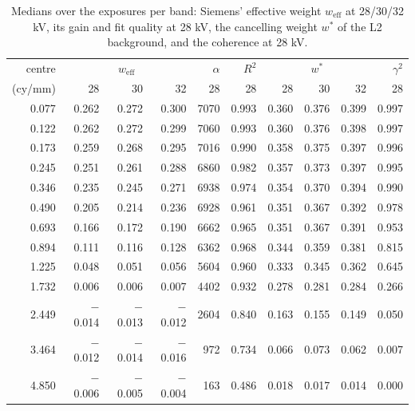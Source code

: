 \documentclass[11pt,a4paper]{article}
\newcommand{\weff}{w_\mathrm{eff}}
\newcommand{\ws}{w^{*}}
\begin{document}
\begin{table}[H]\centering\small
\caption{Medians over the exposures per band: Siemens' effective weight $\weff$ at 28/30/32 kV, its gain and fit
quality at 28 kV, the cancelling weight $\ws$ of the L2 background, and the coherence at 28 kV.}\label{tab:siemens}
\begin{tabular}{r|rrr|rr|rrr|r}
\toprule
centre & \multicolumn{3}{c|}{$\weff$} & $\alpha$ & $R^2$ & \multicolumn{3}{c|}{$\ws$} & $\gamma^2$ \\
(cy/mm) & 28 & 30 & 32 & 28 & 28 & 28 & 30 & 32 & 28 \\
\midrule
0.077 & 0.262 & 0.272 & 0.300 & 7070 & 0.993 & 0.360 & 0.376 & 0.399 & 0.997 \\
0.122 & 0.262 & 0.272 & 0.299 & 7060 & 0.993 & 0.360 & 0.376 & 0.398 & 0.997 \\
0.173 & 0.259 & 0.268 & 0.295 & 7016 & 0.990 & 0.358 & 0.375 & 0.397 & 0.996 \\
0.245 & 0.251 & 0.261 & 0.288 & 6860 & 0.982 & 0.357 & 0.373 & 0.397 & 0.995 \\
0.346 & 0.235 & 0.245 & 0.271 & 6938 & 0.974 & 0.354 & 0.370 & 0.394 & 0.990 \\
0.490 & 0.205 & 0.214 & 0.236 & 6928 & 0.961 & 0.351 & 0.367 & 0.392 & 0.978 \\
0.693 & 0.166 & 0.172 & 0.190 & 6662 & 0.965 & 0.351 & 0.367 & 0.391 & 0.953 \\
0.894 & 0.111 & 0.116 & 0.128 & 6362 & 0.968 & 0.344 & 0.359 & 0.381 & 0.815 \\
1.225 & 0.048 & 0.051 & 0.056 & 5604 & 0.960 & 0.333 & 0.345 & 0.362 & 0.645 \\
1.732 & 0.006 & 0.006 & 0.007 & 4402 & 0.932 & 0.278 & 0.281 & 0.284 & 0.266 \\
2.449 & $-$0.014 & $-$0.013 & $-$0.012 & 2604 & 0.840 & 0.163 & 0.155 & 0.149 & 0.050 \\
3.464 & $-$0.012 & $-$0.014 & $-$0.016 & 972  & 0.734 & 0.066 & 0.073 & 0.062 & 0.007 \\
4.850 & $-$0.006 & $-$0.005 & $-$0.004 & 163  & 0.486 & 0.018 & 0.017 & 0.014 & 0.000 \\
\bottomrule
\end{tabular}
\end{table}
\end{document}
